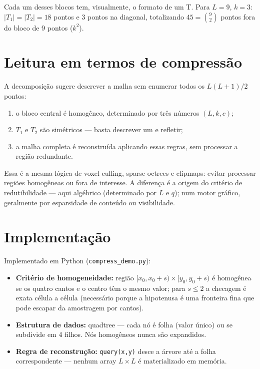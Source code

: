 \documentclass[11pt,a4paper]{article}
\begin{document}
Cada um desses blocos tem, visualmente, o formato de um T. Para $L=9$, $k=3$: $|T_1| = |T_2| = 18$ pontos e 3 pontos na diagonal, totalizando $45 = \binom{9}{2}$ pontos fora do bloco de 9 pontos ($k^2$).

\section{Leitura em termos de compressão}

A decomposição sugere descrever a malha sem enumerar todos os $L(L+1)/2$ pontos:

\begin{enumerate}
  \item o bloco central é homogêneo, determinado por três números $(L, k, c)$;
  \item $T_1$ e $T_2$ são simétricos --- basta descrever um e refletir;
  \item a malha completa é reconstruída aplicando essas regras, sem processar a região redundante.
\end{enumerate}

Essa é a mesma lógica de voxel culling, sparse octrees e clipmaps: evitar processar regiões homogêneas ou fora de interesse. A diferença é a origem do critério de redutibilidade --- aqui algébrico (determinado por $L$ e $q$); num motor gráfico, geralmente por esparsidade de conteúdo ou visibilidade.

\section{Implementação}

Implementado em Python (\texttt{compress\_demo.py}):

\begin{itemize}
  \item \textbf{Critério de homogeneidade:} região $[x_0, x_0+s) \times [y_0, y_0+s)$ é homogênea se os quatro cantos e o centro têm o mesmo valor; para $s \le 2$ a checagem é exata célula a célula (necessário porque a hipotenusa é uma fronteira fina que pode escapar da amostragem por cantos).
  \item \textbf{Estrutura de dados:} quadtree --- cada nó é folha (valor único) ou se subdivide em 4 filhos. Nós homogêneos nunca são expandidos.
  \item \textbf{Regra de reconstrução:} \texttt{query(x,y)} desce a árvore até a folha correspondente --- nenhum array $L \times L$ é materializado em memória.
\end{itemize}
\end{document}
